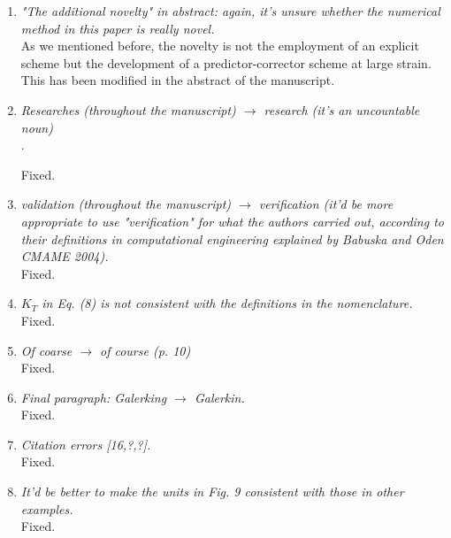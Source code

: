 \documentclass[12pt]{article}
\begin{document}
\begin{enumerate}
    \item \textit{"The additional novelty" in abstract: again, it's unsure whether the numerical method in this paper is really novel.}\\
    
    As we mentioned before, the novelty is not the employment of an explicit scheme but the development of a predictor-corrector scheme at large strain. This has been modified in the abstract of the manuscript.
    
    \item \textit{Researches (throughout the manuscript) $\rightarrow$ research (it's an uncountable noun)}\\.

    Fixed.

    \item \textit{validation (throughout the manuscript) $\rightarrow$ verification (it'd be more appropriate to use "verification" for what the authors carried out, according to their definitions in computational engineering explained by Babuska and Oden CMAME 2004).}\\

    Fixed.

    \item \textit{$K_T$ in Eq. (8) is not consistent with the definitions in the nomenclature.}\\
    
    Fixed.
    
    \item \textit{Of coarse $\rightarrow$ of course (p. 10)}\\
    
    Fixed.
    
    \item \textit{Final paragraph: Galerking $\rightarrow$ Galerkin.}\\

    Fixed.
    
    \item \textit{Citation errors [16,?,?].}\\
    
    Fixed.
    
    \item \textit{It'd be better to make the units in Fig. 9 consistent with those in other examples.}\\
    
    Fixed.
    
\end{enumerate}
\end{document}
